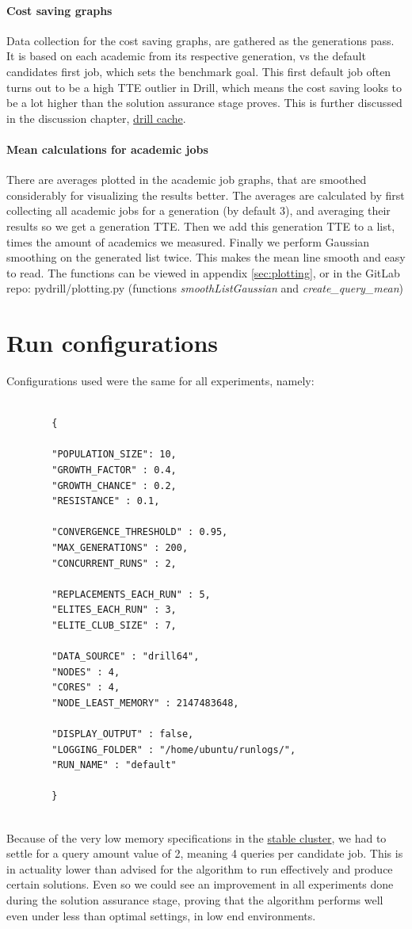 \documentclass[a4paper,english]{report}
\begin{document}
	\paragraph{Cost saving graphs}
	Data collection for the cost saving graphs, are gathered as the generations pass. It is based on each academic from its respective generation, vs the default candidates first job, which sets the benchmark goal. This first default job often turns out to be a high TTE outlier in Drill, which means the cost saving looks to be a lot higher than the solution assurance stage proves. This is further discussed in the discussion chapter, \hyperref[sec:cache]{drill cache}.
	\paragraph{Mean calculations for academic jobs}
	There are averages plotted in the academic job graphs, that are smoothed considerably for visualizing the results better. The averages are calculated by first collecting all academic jobs for a generation (by default 3), and averaging their results so we get a generation TTE. Then we add this generation TTE to a list, times the amount of academics we measured. Finally we perform Gaussian smoothing on the generated list twice. This makes the mean line smooth and easy to read. The functions can be viewed in appendix \ref{sec:plotting}, or in the GitLab repo: pydrill/plotting.py (functions \textit{smoothListGaussian} and \textit{create\_query\_mean})
	\clearpage
	\section{Run configurations}
	Configurations used were the same for all experiments, namely:
	\begin{verbatim}
	
		{
		
		"POPULATION_SIZE": 10,
		"GROWTH_FACTOR" : 0.4,
		"GROWTH_CHANCE" : 0.2,
		"RESISTANCE" : 0.1,
		
		"CONVERGENCE_THRESHOLD" : 0.95,
		"MAX_GENERATIONS" : 200,
		"CONCURRENT_RUNS" : 2,
		
		"REPLACEMENTS_EACH_RUN" : 5,
		"ELITES_EACH_RUN" : 3,
		"ELITE_CLUB_SIZE" : 7,
		
		"DATA_SOURCE" : "drill64",
		"NODES" : 4,
		"CORES" : 4,
		"NODE_LEAST_MEMORY" : 2147483648,
		
		"DISPLAY_OUTPUT" : false,
		"LOGGING_FOLDER" : "/home/ubuntu/runlogs/",
		"RUN_NAME" : "default"
		
		}
		
	\end{verbatim}
	Because of the very low memory specifications in the \hyperref[table:cluster_stable]{stable cluster}, we had to settle for a query amount value of 2, meaning 4 queries per candidate job. This is in actuality lower than advised for the algorithm to run effectively and produce certain solutions. Even so we could see an improvement in all experiments done during the solution assurance stage, proving that the algorithm performs well even under less than optimal settings, in low end environments.
	\clearpage
\end{document}

